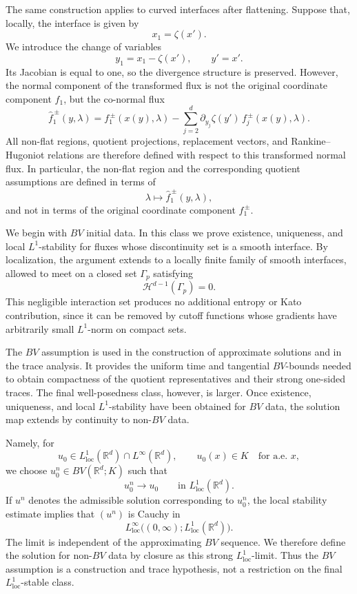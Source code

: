 \documentclass[11pt]{amsart}
\numberwithin{equation}{section}
\theoremstyle{plain}
\theoremstyle{definition}
\theoremstyle{remark}
\begin{document}
The same construction applies to curved interfaces after flattening. Suppose
that, locally, the interface is given by
\[
    x_1=\zeta(x').
\]
We introduce the change of variables
\[
    y_1=x_1-\zeta(x'),
    \qquad
    y'=x'.
\]
Its Jacobian is equal to one, so the divergence structure is preserved.
However, the normal component of the transformed flux is not the original
coordinate component \(f_1\), but the co-normal flux
\[
    \widehat f_1^{\,\pm}(y,\lambda)
    =
    f_1^{\,\pm}(x(y),\lambda)
    -
    \sum_{j=2}^d
    \partial_{y_j}\zeta(y')\,f_j^{\,\pm}(x(y),\lambda).
\]
All non-flat regions, quotient projections, replacement vectors, and
Rankine--Hugoniot relations are therefore defined with respect to this
transformed normal flux. In particular, the non-flat region and the
corresponding quotient assumptions are defined in terms of
\[
    \lambda\longmapsto \widehat f_1^{\,\pm}(y,\lambda),
\]
and not in terms of the original coordinate component
\(f_1^{\,\pm}\).

We begin with \(BV\) initial data. In this class we prove existence,
uniqueness, and local \(L^1\)-stability for fluxes whose discontinuity set is a
smooth interface. By localization, the argument extends to a locally finite
family of smooth interfaces, allowed to meet on a closed set \(\Gamma_p\)
satisfying
\[
    \mathcal H^{d-1}(\Gamma_p)=0.
\]
This negligible interaction set produces no additional entropy or Kato
contribution, since it can be removed by cutoff functions whose gradients have
arbitrarily small \(L^1\)-norm on compact sets.

The \(BV\) assumption is used in the construction of approximate solutions and
in the trace analysis. It provides the uniform time and tangential
\(BV\)-bounds needed to obtain compactness of the quotient representatives and
their strong one-sided traces. The final well-posedness class, however, is
larger. Once existence, uniqueness, and local \(L^1\)-stability have been
obtained for \(BV\) data, the solution map extends by continuity to non-\(BV\)
data.

Namely, for
\[
    u_0\in L^1_{\mathrm{loc}}(\mathbb R^d)\cap L^\infty(\mathbb R^d),
    \qquad
    u_0(x)\in K
    \quad\text{for a.e. }x,
\]
we choose \(u_0^n\in BV(\mathbb R^d;K)\) such that
\[
    u_0^n\to u_0
    \qquad
    \text{in }L^1_{\mathrm{loc}}(\mathbb R^d).
\]
If \(u^n\) denotes the admissible solution corresponding to \(u_0^n\), the
local stability estimate implies that \((u^n)\) is Cauchy in
\[
    L^\infty_{\mathrm{loc}}
    \bigl((0,\infty);L^1_{\mathrm{loc}}(\mathbb R^d)\bigr).
\]
The limit is independent of the approximating \(BV\) sequence. We therefore
define the solution for non-\(BV\) data by closure as this strong
\(L^1_{\mathrm{loc}}\)-limit. Thus the \(BV\) assumption is a construction
and trace hypothesis, not a restriction on the final
\(L^1_{\mathrm{loc}}\)-stable class.
\end{document}
